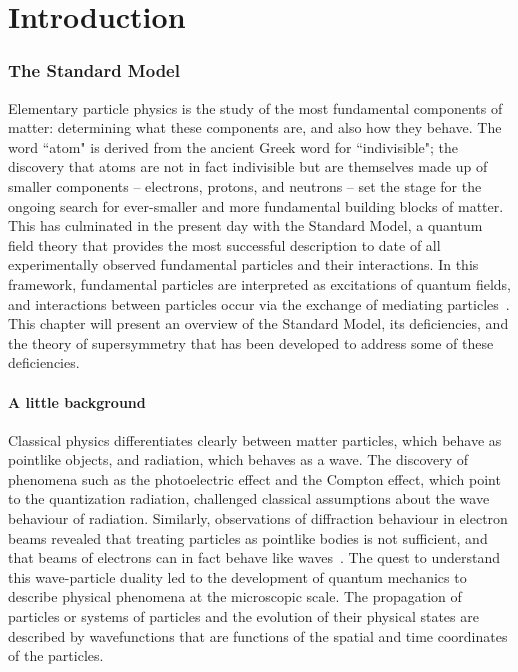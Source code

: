 \chapter{Introduction\label{sec:intro}}



\subsection{The Standard Model\label{sec:SM}}

Elementary particle physics is the study of the most fundamental components of matter: determining what these components are, and also how they behave. The word ``atom" is derived from the ancient Greek word for ``indivisible"; the discovery that atoms are not in fact indivisible but are themselves made up of smaller components -- electrons, protons, and neutrons -- set the stage for the ongoing search for ever-smaller and more fundamental building blocks of matter. This has culminated in the present day with the Standard Model, a quantum field theory that provides the most successful description to date of all experimentally observed fundamental particles and their interactions. In this framework, fundamental particles are interpreted as excitations of quantum fields, and interactions between particles occur via the exchange of mediating particles~\cite{BettiniPhysics}. This chapter will present an overview of the Standard Model, its deficiencies, and the theory of supersymmetry that has been developed to address some of these deficiencies.

\subsubsection{A little background\label{sec:SM-history}}

Classical physics differentiates clearly between matter particles, which behave as pointlike objects, and radiation, which behaves as a wave. The discovery of phenomena such as the photoelectric effect and the Compton effect, which point to the quantization radiation, challenged classical assumptions about the wave behaviour of radiation. Similarly, observations of diffraction behaviour in electron beams revealed that treating particles as pointlike bodies is not sufficient, and that beams of electrons can in fact behave like waves~\cite{MessiahPhysics}. The quest to understand this wave-particle duality led to the development of quantum mechanics to describe physical phenomena at the microscopic scale. The propagation of particles or systems of particles and the evolution of their physical states are described by wavefunctions that are functions of the spatial and time coordinates of the particles.

